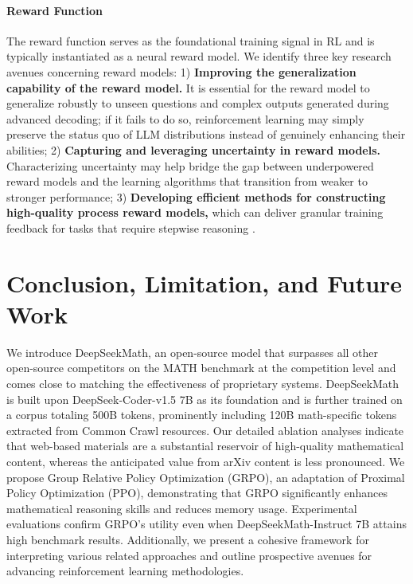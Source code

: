 \begin{itemize}[topsep=0pt]
\begin{itemize}[topsep=0pt]
\paragraph{Reward Function} The reward function serves as the foundational training signal in RL and is typically instantiated as a neural reward model. We identify three key research avenues concerning reward models: 1) \textbf{Improving the generalization capability of the reward model.} It is essential for the reward model to generalize robustly to unseen questions and complex outputs generated during advanced decoding; if it fails to do so, reinforcement learning may simply preserve the status quo of LLM distributions instead of genuinely enhancing their abilities; 2) \textbf{Capturing and leveraging uncertainty in reward models.} Characterizing uncertainty may help bridge the gap between underpowered reward models and the learning algorithms that transition from weaker to stronger performance; 3) \textbf{Developing efficient methods for constructing high-quality process reward models,} which can deliver granular training feedback for tasks that require stepwise reasoning \citep{lightman2023let,wang2023math}.

\section{Conclusion, Limitation, and Future Work} 
We introduce DeepSeekMath, an open-source model that surpasses all other open-source competitors on the MATH benchmark at the competition level and comes close to matching the effectiveness of proprietary systems. DeepSeekMath is built upon DeepSeek-Coder-v1.5 7B as its foundation and is further trained on a corpus totaling 500B tokens, prominently including 120B math-specific tokens extracted from Common Crawl resources. Our detailed ablation analyses indicate that web-based materials are a substantial reservoir of high-quality mathematical content, whereas the anticipated value from arXiv content is less pronounced. We propose Group Relative Policy Optimization (GRPO), an adaptation of Proximal Policy Optimization (PPO), demonstrating that GRPO significantly enhances mathematical reasoning skills and reduces memory usage. Experimental evaluations confirm GRPO’s utility even when DeepSeekMath-Instruct 7B attains high benchmark results. Additionally, we present a cohesive framework for interpreting various related approaches and outline prospective avenues for advancing reinforcement learning methodologies.


\end{itemize}
\end{itemize}
